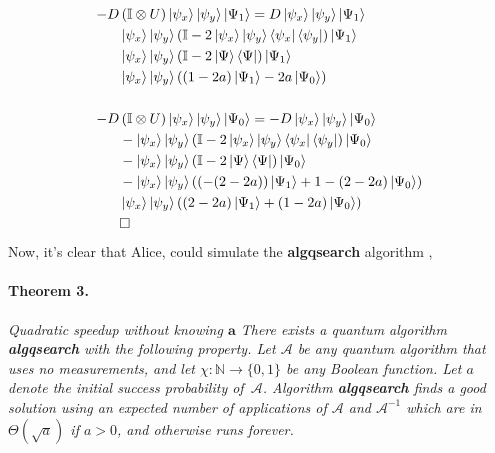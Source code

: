 \documentclass{article}
\begin{document}
\begin{multicols}{2}
    \begin{equation*}
      \begin{split}
    - D & \left( \mathbb{I} \otimes U \right)  \ket{\psi_{x}}\ket{\psi_{y}} \ket{\Psi_1} =    D  \ket{\psi_{x}}\ket{\psi_{y}} \ket{\Psi_1} \\
  &  \ket{\psi_{x}}\ket{\psi_{y}} \left( \mathbb{I} - 2 \ket{\psi_{x}}\ket{\psi_{y}} \bra{ \psi_{x}}\bra{\psi_{y}} \right) \ket{\Psi_1} \\
  &  \ket{\psi_{x}}\ket{\psi_{y}} \left( \mathbb{I} - 2 \ket{\Psi} \bra{\Psi} \right) \ket{\Psi_1}  \\ 
  &  \ket{\psi_{x}}\ket{\psi_{y}} \left( \left( 1 - 2a  \right)\ket{\Psi_1} - 2a \ket{\Psi_0} \right) \\ 
  & \\ 
  - D & \left( \mathbb{I} \otimes U \right)  \ket{\psi_{x}}\ket{\psi_{y}} \ket{\Psi_0} =   - D  \ket{\psi_{x}}\ket{\psi_{y}} \ket{\Psi_0} \\
  &  - \ket{\psi_{x}}\ket{\psi_{y}} \left( \mathbb{I} - 2 \ket{\psi_{x}}\ket{\psi_{y}} \bra{ \psi_{x}}\bra{\psi_{y}} \right) \ket{\Psi_0} \\
  &  - \ket{\psi_{x}}\ket{\psi_{y}} \left( \mathbb{I} - 2 \ket{\Psi} \bra{\Psi} \right) \ket{\Psi_0} \\ 
  &  - \ket{\psi_{x}}\ket{\psi_{y}} \left( \left(  - (2-2a)  \right)\ket{\Psi_1} + 1 -(2 - 2a) \ket{\Psi_0} \right) \\ 
  & \ket{\psi_{x}}\ket{\psi_{y}} \left( \left( 2-2a \right)\ket{\Psi_1} + \left(1  - 2a\right) \ket{\Psi_0} \right) \\ 
  & \square
\end{split}
\end{equation*}
Now, it's clear that Alice, could simulate the \textbf{algqsearch} algorithm \cite{Brassard_2002}, 

\paragraph{Theorem 3.} \textit{Quadratic speedup without knowing $\mathbf{a}$
There exists a quantum algorithm \textbf{algqsearch} with the following property.
Let $\mathcal A$ be any quantum algorithm that uses no measurements,
and let $\chi : \mathbb{N}  \rightarrow \{0,1\}$ be any Boolean function.
Let $a$ denote the initial success probability of~$\mathcal A$.
Algorithm \textbf{algqsearch} finds a good solution using an expected number
of applications of $\mathcal A$ and ${\mathcal A}^{-1}$ which are in
$\Theta(\sqrt a)$ if $a>0$, and otherwise runs forever.}


\end{multicols}
\end{document}
